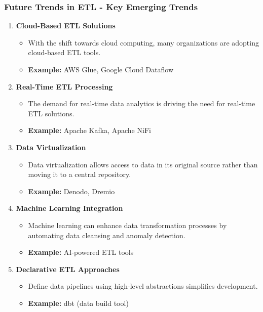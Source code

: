\documentclass[aspectratio=169]{beamer}
\begin{document}
\begin{frame}[fragile]
    \frametitle{Future Trends in ETL - Key Emerging Trends}
    \begin{enumerate}
        \item \textbf{Cloud-Based ETL Solutions}
            \begin{itemize}
                \item With the shift towards cloud computing, many organizations are adopting cloud-based ETL tools.
                \item \textbf{Example:} AWS Glue, Google Cloud Dataflow
            \end{itemize}
        
        \item \textbf{Real-Time ETL Processing}
            \begin{itemize}
                \item The demand for real-time data analytics is driving the need for real-time ETL solutions.
                \item \textbf{Example:} Apache Kafka, Apache NiFi
            \end{itemize}
        
        \item \textbf{Data Virtualization}
            \begin{itemize}
                \item Data virtualization allows access to data in its original source rather than moving it to a central repository.
                \item \textbf{Example:} Denodo, Dremio
            \end{itemize}
        
        \item \textbf{Machine Learning Integration}
            \begin{itemize}
                \item Machine learning can enhance data transformation processes by automating data cleansing and anomaly detection.
                \item \textbf{Example:} AI-powered ETL tools
            \end{itemize}
        
        \item \textbf{Declarative ETL Approaches}
            \begin{itemize}
                \item Define data pipelines using high-level abstractions simplifies development.
                \item \textbf{Example:} dbt (data build tool)
            \end{itemize}
    \end{enumerate}
\end{frame}
\end{document}

